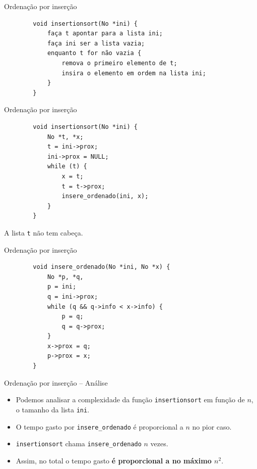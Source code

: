 \documentclass{beamer}
\newcommand{\cod}[1]{\texttt{#1}}
\begin{document}
\begin{frame}[fragile]{Ordenação por inserção}

    \begin{verbatim}
        void insertionsort(No *ini) {
            faça t apontar para a lista ini;
            faça ini ser a lista vazia;
            enquanto t for não vazia {
                remova o primeiro elemento de t;
                insira o elemento em ordem na lista ini;
            }
        }
    \end{verbatim}

\end{frame}

\begin{frame}[fragile]{Ordenação por inserção}

    \begin{verbatim}
        void insertionsort(No *ini) {
            No *t, *x;
            t = ini->prox;
            ini->prox = NULL;
            while (t) {
                x = t;
                t = t->prox;
                insere_ordenado(ini, x);
            }
        }
    \end{verbatim}

    A lista \cod{t} não tem cabeça.
\end{frame}

\begin{frame}[fragile]{Ordenação por inserção}

    \begin{verbatim}
        void insere_ordenado(No *ini, No *x) {
            No *p, *q,
            p = ini;
            q = ini->prox;
            while (q && q->info < x->info) {
                p = q;
                q = q->prox;
            }
            x->prox = q;
            p->prox = x;
        }
    \end{verbatim}

\end{frame}

\begin{frame}[fragile]{Ordenação por inserção -- Análise}

    \begin{itemize}
        \item Podemos analisar a complexidade da função \cod{insertionsort} em função de $n$, o tamanho da lista \cod{ini}.
        \item O tempo gasto por \cod{insere_ordenado} é proporcional a $n$ no pior caso.
        \item \cod{insertionsort} chama \cod{insere_ordenado} $n$ vezes.
        \item Assim, no total o tempo gasto \textbf{é proporcional a no máximo $n^2$}.
    \end{itemize}

\end{frame}
\end{document}
